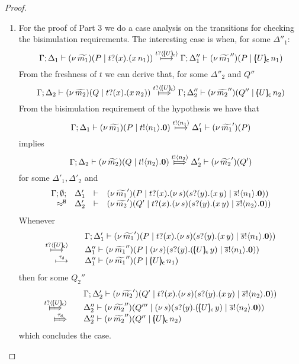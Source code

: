 \begin{proof}
\begin{enumerate}[1.]
		\item	For the proof of Part 3 we do a case analysis on the transitions for checking the bisimulation requirements. The interesting case is when, for some $\Delta''_1$:
				\[
					\Gamma; \Delta_1 \proves \newsp{\widetilde{m_1}}{P \Par \binp{t}{x} (\appl{x}{n_1})}
					\hby{\bactinp{t}{\omapchar{U}}} 
					\Gamma; \Delta_1'' \proves \newsp{\widetilde{m_1}''}{P \Par \appl{\omapchar{U}}{n_1}}
				\]
				From the freshness of $t$ we can derive that, for some $\Delta''_2$ and $Q''$
				\[
					\Gamma; \Delta_2 \proves \newsp{\widetilde{m_2}}{Q \Par \binp{t}{x}(\appl{x}{n_2})}
					\Hby{\bactinp{t}{\omapchar{U}}} 
					\Gamma; \Delta_2'' \proves \newsp{\widetilde{m_2}''}{Q'' \Par \appl{\omapchar{U}}{n_2}}
				\]
				From the bisimulation requirement of the hypothesis we have that
				\[
					\Gamma; \Delta_1 \vdash  (\nu\, \widetilde{m_1})(P \;|\; t ! \langle n_1 \rangle . \mathbf{0})  \stackrel{t ! \langle n_1 \rangle }{\longmapsto} \Delta_1' \vdash  (\nu\, \widetilde{m_1}')(P)
				\]
				implies
				\[
					\horel{\Gamma}{\Delta_2}{ \newsp{\widetilde{m_2}}{Q \Par \bout{t}{n_2} \inact} }
					{\Hby{\bactout{t}{n_2} }}
					{\Delta_2'}{ \newsp{\widetilde{m_2}'}{Q'} }
				\]
				for some $\Delta'_1, \Delta'_2$ and
				\[
					\begin{array}{rcll} \Gamma; \emptyset; &\Delta_1'& \vdash&  (\nu\, \widetilde{m_1}')(P \;|\; t ? (x) . (\nu\, s)( s ? (y) .(x\, {y}) \;|\; \overline{s} ! \langle n_1 \rangle . \mathbf{0} ) ) \\ \approx^\mathtt{H} &\Delta_2'& \vdash &   (\nu\, \widetilde{m_2}')(Q' \;|\; t ? (x) . (\nu\, s)( s ? (y) .(x\, {y}) \;|\; \overline{s} ! \langle n_2 \rangle . \mathbf{0} ))  \end{array}
				\]
				Whenever
				\[
				\begin{array}{rcl}
					&& \Gamma; \Delta_1' \proves \newsp{\widetilde{m_1}'}{P \Par \binp{t}{x} \newsp{s}{ \binp{s}{y}(\appl{x}{y})\Par \bout{\dual{s}}{n_1} \inact}}\\ 
					\hby{\bactinp{t}{\omapchar{U}}}&& 
					\Delta_1'' \proves \newsp{\widetilde{m_1}''}{P \Par \newsp{s}{ \binp{s}{y} (\appl{\omapchar{U}}{y}) \Par \bout{\dual{s}}{n_1} \inact }}
					\\
					\hby{\dtau} &&
					\Delta_1'' \proves \newsp{\widetilde{m_1}''}{P \Par \appl{\omapchar{U}}{n_1}}
				\end{array}
				\]
				then for some $Q_2''$
				\[
				\begin{array}{rcl}
					&&\Gamma; \Delta_2' \proves \newsp{\widetilde{m_2}'}{Q' \Par \binp{t}{x} \newsp{s}{ \binp{s}{y}(\appl{x}{y}) \Par \bout{\dual{s}}{n_2} \inact } }
					\\
					\Hby{\bactinp{t}{\omapchar{U}}} &&
					\Delta_2'' \proves \newsp{\widetilde{m_2}''}{Q''' \Par \newsp{s}{ \binp{s}{y}(\appl{\omapchar{U}}{y}) \Par \bout{\dual{s}}{n_2} \inact }}
					\\
					\Hby{\dtau} &&
					\Delta_2'' \proves \newsp{\widetilde{m_2}''}{Q'' \Par \appl{\omapchar{U}}{n_2}}
				\end{array}
				\]
				which concludes the case.
				

\end{enumerate}
\end{proof}
